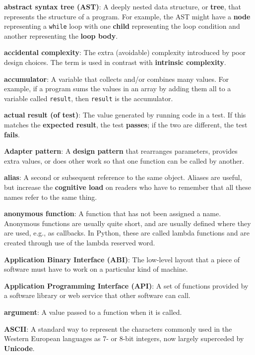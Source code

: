 \documentclass[krantzl]{krantz}
\newcommand{\glosskey}[1]{\textbf{#1}}
\begin{document}
\noindent \textbf{\glosskey{abstract syntax tree} (AST)}: 
A deeply nested data structure, or \glosskey{tree}, that represents the structure of a program. For example, the AST might have a \glosskey{node} representing a \texttt{while} loop with one \glosskey{child} representing the loop condition and another representing the \glosskey{loop body}.


\noindent \textbf{\glosskey{accidental complexity}}: 
The extra (avoidable) complexity introduced by poor design choices. The term is used in contrast with \glosskey{intrinsic complexity}.


\noindent \textbf{\glosskey{accumulator}}: 
A variable that collects and/or combines many values.  For example, if a program sums the values in an array by adding them all to a variable called \texttt{result}, then \texttt{result} is the accumulator.


\noindent \textbf{\glosskey{actual result (of test)}}: 
The value generated by running code in a test. If this matches the \glosskey{expected result}, the test \glosskey{passes}; if the two are different, the test \glosskey{fails}.


\noindent \textbf{\glosskey{Adapter pattern}}: 
A \glosskey{design pattern} that rearranges parameters, provides extra values, or does other work so that one function can be called by another.


\noindent \textbf{\glosskey{alias}}: 
A second or subsequent reference to the same object. Aliases are useful, but increase the \glosskey{cognitive load} on readers who have to remember that all these names refer to the same thing.


\noindent \textbf{\glosskey{anonymous function}}: 
A function that has not been assigned a name. Anonymous functions are usually quite short, and are usually defined where they are used, e.g., as callbacks. In Python, these are called lambda functions and are created through use of the lambda reserved word.


\noindent \textbf{\glosskey{Application Binary Interface} (ABI)}: 
The low-level layout that a piece of software must have to work on a particular kind of machine.


\noindent \textbf{\glosskey{Application Programming Interface} (API)}: 
A set of functions provided by a software library or web service that other software can call.


\noindent \textbf{\glosskey{argument}}: 
A value passed to a function when it is called.


\noindent \textbf{\glosskey{ASCII}}: 
A standard way to represent the characters commonly used in the Western European languages as 7- or 8-bit integers, now largely superceded by \glosskey{Unicode}.
\end{document}
